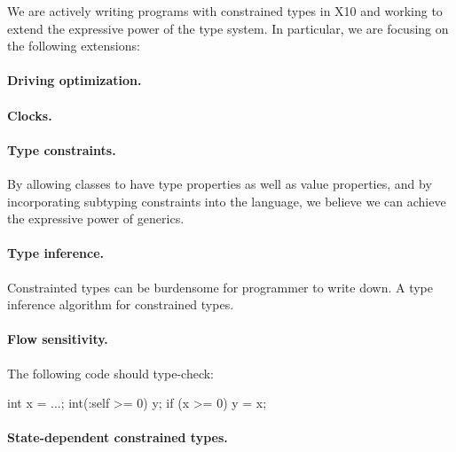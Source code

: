 %
%
%
%

We are actively writing programs with constrained types in X10 and 
working to extend the expressive power of the type system.
In particular, we are focusing on the following extensions:

\paragraph{Driving optimization.}
\paragraph{Clocks.}
\paragraph{Type constraints.}
By allowing classes to have type properties as well as value properties,
and by incorporating subtyping constraints into the language, we believe we can achieve the expressive power of generics.

\paragraph{Type inference.}  Constrainted types can be burdensome for
programmer to write down.  A type inference algorithm for constrained types.

\paragraph{Flow sensitivity.}  The following code should type-check:
\begin{displayxten}
int x = ...;
int(:self >= 0) y;
if (x >= 0) {
    y = x;
}
\end{displayxten}

\paragraph{State-dependent constrained types.}

